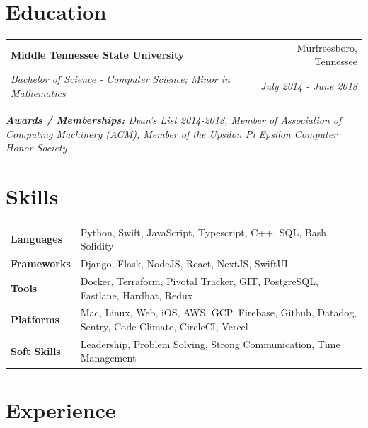 \documentclass[a4paper,20pt]{article}
\makeatletter
\newcommand{\resumeSubheading}[4]{
  \vspace{-1pt}\item
    \begin{tabular*}{0.97\textwidth}{l@{\extracolsep{\fill}}r}
      \textbf{#1} & #2 \\
      \textit{#3} & \textit{#4} \\
    \end{tabular*}\vspace{-5pt}
}
\makeatother
\begin{document}
{\color{MidnightBlue} \section{\textbf{Education}}}
  \resumeSubHeadingListStart
    \resumeSubheading
      {Middle Tennessee State University}{Murfreesboro, Tennessee}
      {Bachelor of Science - Computer Science; Minor in Mathematics}{July 2014 - June 2018}
      \vspace{5pt}
      {\scriptsize \textit{ \footnotesize{\newline{}\textbf{Awards / Memberships:} Dean’s List 2014-2018, Member of Association of Computing Machinery (ACM), Member of the Upsilon Pi Epsilon Computer Honor Society}}}
    \resumeSubHeadingListEnd

{\color{Periwinkle} \section{\textbf{Skills}}}
\begin{tabular}{p{3cm} p{24cm}}
\hspace{0.5cm}\textbf{Languages} & Python, Swift, JavaScript, Typescript, C++, SQL, Bash, Solidity \\
\hspace{0.5cm}\textbf{Frameworks} & Django, Flask, NodeJS, React, NextJS, SwiftUI \\
\hspace{0.5cm}\textbf{Tools} & Docker, Terraform, Pivotal Tracker, GIT, PostgreSQL, Fastlane, Hardhat, Redux \\
\hspace{0.5cm}\textbf{Platforms} & Mac, Linux, Web, iOS, AWS, GCP, Firebase, Github, Datadog, Sentry, Code Climate, CircleCI, Vercel \\
\hspace{0.5cm}\textbf{Soft Skills} & Leadership, Problem Solving, Strong Communication, Time Management \\
\end{tabular}

{\color{ForestGreen} \section{\textbf{Experience}}}

  \resumeSubHeadingListStart
\end{document}
